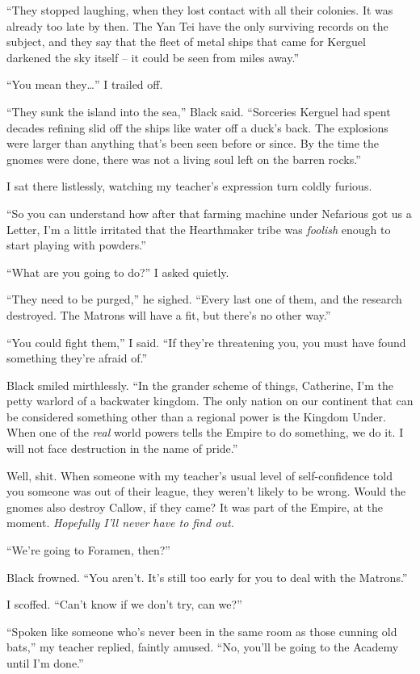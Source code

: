 \documentclass[12pt, openany]{book}
\begin{document}
“They stopped laughing, when they lost contact with all their colonies. It was already too late by then. The Yan Tei have the only surviving records on the subject, and they say that the fleet of metal ships that came for Kerguel darkened the sky itself – it could be seen from miles away.”

“You mean they…” I trailed off.

“They sunk the island into the sea,” Black said. “Sorceries Kerguel had spent decades refining slid off the ships like water off a duck’s back. The explosions were larger than anything that’s been seen before or since. By the time the gnomes were done, there was not a living soul left on the barren rocks.”

I sat there listlessly, watching my teacher’s expression turn coldly furious.

“So you can understand how after that farming machine under Nefarious got us a Letter, I’m a little irritated that the Hearthmaker tribe was\textit{ foolish} enough to start playing with powders.”

“What are you going to do?” I asked quietly.

“They need to be purged,” he sighed. “Every last one of them, and the research destroyed. The Matrons will have a fit, but there’s no other way.”

“You could fight them,” I said. “If they’re threatening you, you must have found something they’re afraid of.”

Black smiled mirthlessly. “In the grander scheme of things, Catherine, I’m the petty warlord of a backwater kingdom. The only nation on our continent that can be considered something other than a regional power is the Kingdom Under. When one of the \textit{real }world powers tells the Empire to do something, we do it. I will not face destruction in the name of pride.”

Well, shit. When someone with my teacher’s usual level of self-confidence told you someone was out of their league, they weren’t likely to be wrong. Would the gnomes also destroy Callow, if they came? It was part of the Empire, at the moment. \textit{Hopefully I’ll never have to find out.}

“We’re going to Foramen, then?”

Black frowned. “You aren’t. It’s still too early for you to deal with the Matrons.”

I scoffed. “Can’t know if we don’t try, can we?”

“Spoken like someone who’s never been in the same room as those cunning old bats,” my teacher replied, faintly amused. “No, you’ll be going to the Academy until I’m done.”
\end{document}
